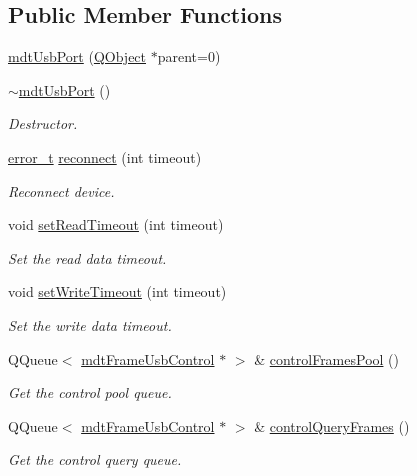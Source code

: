 \subsection*{Public Member Functions}
\begin{DoxyCompactItemize}
\item 
\hyperlink{classmdt_usb_port_a311650f4b2d29b6f16336c8777196d1c}{mdt\-Usb\-Port} (\hyperlink{class_q_object}{Q\-Object} $\ast$parent=0)
\item 
\hyperlink{classmdt_usb_port_afa9f1942ca4ae384887441e01b362c16}{$\sim$mdt\-Usb\-Port} ()
\begin{DoxyCompactList}\small\item\em Destructor. \end{DoxyCompactList}\item 
\hyperlink{classmdt_abstract_port_ad4121bb930c95887e77f8bafa065a85e}{error\-\_\-t} \hyperlink{classmdt_usb_port_af2399348faf1abc20130eab20cfc36ee}{reconnect} (int timeout)
\begin{DoxyCompactList}\small\item\em Reconnect device. \end{DoxyCompactList}\item 
void \hyperlink{classmdt_usb_port_a44ed5024a81a573b5196b8f64c42cd6a}{set\-Read\-Timeout} (int timeout)
\begin{DoxyCompactList}\small\item\em Set the read data timeout. \end{DoxyCompactList}\item 
void \hyperlink{classmdt_usb_port_a592af88bd7e7f45dd80df0ecab375ace}{set\-Write\-Timeout} (int timeout)
\begin{DoxyCompactList}\small\item\em Set the write data timeout. \end{DoxyCompactList}\item 
Q\-Queue$<$ \hyperlink{classmdt_frame_usb_control}{mdt\-Frame\-Usb\-Control} $\ast$ $>$ \& \hyperlink{classmdt_usb_port_af146b08006ddbe18fb537ae1a75b622e}{control\-Frames\-Pool} ()
\begin{DoxyCompactList}\small\item\em Get the control pool queue. \end{DoxyCompactList}\item 
Q\-Queue$<$ \hyperlink{classmdt_frame_usb_control}{mdt\-Frame\-Usb\-Control} $\ast$ $>$ \& \hyperlink{classmdt_usb_port_afbb20c403e7a5885d5e4221bab9f304e}{control\-Query\-Frames} ()
\begin{DoxyCompactList}\small\item\em Get the control query queue. \end{DoxyCompactList}\item 

\end{DoxyCompactItemize}
